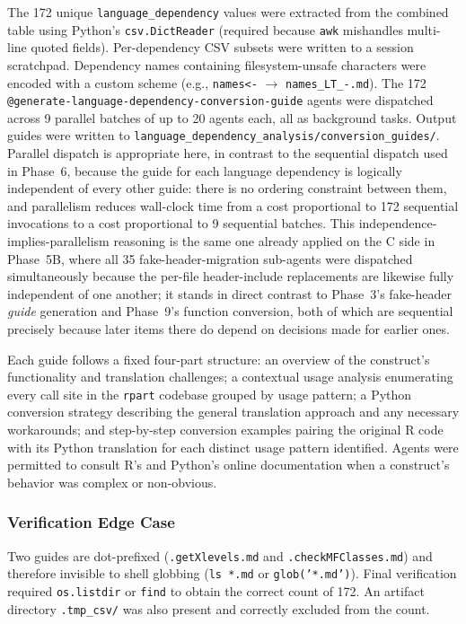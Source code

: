 \documentclass[12pt]{article}
\begin{document}
The 172 unique \texttt{language\_dependency} values were extracted from the combined table using Python's \texttt{csv.DictReader} (required because \texttt{awk} mishandles multi-line quoted fields). Per-dependency CSV subsets were written to a session scratchpad. Dependency names containing filesystem-unsafe characters were encoded with a custom scheme (e.g., \texttt{names<-} $\to$ \texttt{names\_LT\_-.md}). The 172 \texttt{@generate-language-dependency-conversion-guide} agents were dispatched across 9 parallel batches of up to 20 agents each, all as background tasks. Output guides were written to \texttt{language\_dependency\_analysis/conversion\_guides/}. Parallel dispatch is appropriate here, in contrast to the sequential dispatch used in Phase~6, because the guide for each language dependency is logically independent of every other guide: there is no ordering constraint between them, and parallelism reduces wall-clock time from a cost proportional to 172 sequential invocations to a cost proportional to 9 sequential batches. This independence-implies-parallelism reasoning is the same one already applied on the C side in Phase~5B, where all 35 fake-header-migration sub-agents were dispatched simultaneously because the per-file header-include replacements are likewise fully independent of one another; it stands in direct contrast to Phase~3's fake-header \emph{guide} generation and Phase~9's function conversion, both of which are sequential precisely because later items there do depend on decisions made for earlier ones.

Each guide follows a fixed four-part structure: an overview of the construct's functionality and translation challenges; a contextual usage analysis enumerating every call site in the \texttt{rpart} codebase grouped by usage pattern; a Python conversion strategy describing the general translation approach and any necessary workarounds; and step-by-step conversion examples pairing the original R code with its Python translation for each distinct usage pattern identified. Agents were permitted to consult R's and Python's online documentation when a construct's behavior was complex or non-obvious.

\subsubsection{Verification Edge Case}

Two guides are dot-prefixed (\texttt{.getXlevels.md} and \texttt{.checkMFClasses.md}) and therefore invisible to shell globbing (\texttt{ls *.md} or \texttt{glob('*.md')}). Final verification required \texttt{os.listdir} or \texttt{find} to obtain the correct count of 172. An artifact directory \texttt{.tmp\_csv/} was also present and correctly excluded from the count.
\end{document}

